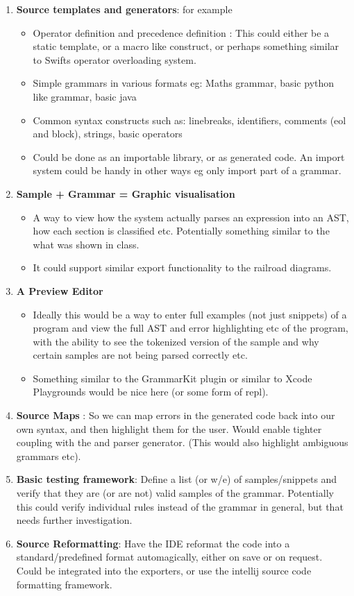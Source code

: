 \begin {enumerate}
	\item \textbf{Source templates and generators}: for example
	  \begin {itemize}
		\item Operator definition and precedence definition : This could either be a static template, or a macro like construct, or perhaps something similar to Swifts operator overloading system.
		\item Simple grammars in various formats eg: Maths grammar, basic python like grammar, basic java
		\item Common syntax constructs such as: linebreaks, identifiers, comments (eol and block), strings, basic operators
		\item Could be done as an importable library, or as generated code. An import system could be handy in other ways eg only import part of a grammar.
	  \end {itemize}
      \item \textbf{Sample + Grammar = Graphic visualisation}
	  \begin {itemize}
		\item A way to view how the system actually parses an expression into an AST, how each section is classified etc. Potentially something similar to the what was shown in class.
		\item It could support similar export functionality to the railroad diagrams.
	  \end {itemize}
      \item \textbf{ A Preview Editor }
	  \begin {itemize}
		\item Ideally this would be a way to enter full examples (not just snippets) of a program and view the full AST and error highlighting etc of the program, with the ability to see the tokenized version of the sample and why certain samples are not being parsed correctly etc.
		\item Something similar to the GrammarKit plugin or similar to Xcode Playgrounds would be nice here (or some form of repl).
	  \end {itemize}
      \item \textbf{Source Maps} : So we can map errors in the generated code back into our own syntax, and then highlight them for the user. Would enable tighter coupling with the and parser generator. (This would also highlight ambiguous grammars etc).
            \item \textbf{Basic testing framework}: Define a list (or w/e) of samples/snippets and verify that they are (or are not)  valid samples of the grammar. Potentially this could verify individual rules instead of the grammar in general, but that needs further investigation.
            \item \textbf{Source Reformatting}: Have the IDE reformat the code into a standard/predefined format automagically, either on save or on request.  Could be integrated into the exporters, or use the intellij source code formatting framework.

\end{enumerate}





